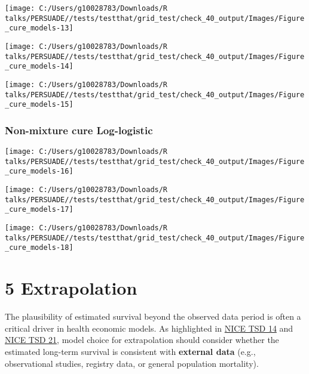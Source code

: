 \documentclass[
]{article}
\begin{document}
\begin{flushleft}\texttt{[image: C:/Users/g10028783/Downloads/R talks/PERSUADE//tests/testthat/grid\_test/check\_40\_output/Images/Figure\_cure\_models-13]} \end{flushleft}

\begin{flushleft}\texttt{[image: C:/Users/g10028783/Downloads/R talks/PERSUADE//tests/testthat/grid\_test/check\_40\_output/Images/Figure\_cure\_models-14]} \end{flushleft}

\begin{flushleft}\texttt{[image: C:/Users/g10028783/Downloads/R talks/PERSUADE//tests/testthat/grid\_test/check\_40\_output/Images/Figure\_cure\_models-15]} \end{flushleft}

\clearpage

\subsubsection{Non-mixture cure
Log-logistic}\label{non-mixture-cure-log-logistic}

\begin{flushleft}\texttt{[image: C:/Users/g10028783/Downloads/R talks/PERSUADE//tests/testthat/grid\_test/check\_40\_output/Images/Figure\_cure\_models-16]} \end{flushleft}

\begin{flushleft}\texttt{[image: C:/Users/g10028783/Downloads/R talks/PERSUADE//tests/testthat/grid\_test/check\_40\_output/Images/Figure\_cure\_models-17]} \end{flushleft}

\begin{flushleft}\texttt{[image: C:/Users/g10028783/Downloads/R talks/PERSUADE//tests/testthat/grid\_test/check\_40\_output/Images/Figure\_cure\_models-18]} \end{flushleft}

\clearpage

\section{5 Extrapolation}\label{extrapolation}

The plausibility of estimated survival beyond the observed data period
is often a critical driver in health economic models. As highlighted in
\href{https://nicedsu.org.uk/wp-content/uploads/2016/03/NICE-DSU-TSD-Survival-analysis.updated-March-2013.v2.pdf}{NICE
TSD 14} and \href{https://www.sheffield.ac.uk/media/34188/download}{NICE
TSD 21}, model choice for extrapolation should consider whether the
estimated long-term survival is consistent with \textbf{external data}
(e.g., observational studies, registry data, or general population
mortality).
\end{document}
